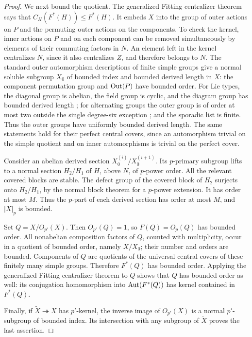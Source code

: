 \begin{proof}
We next bound the quotient.  The generalized Fitting centralizer
theorem \cite[(31.13)]{Aschbacher} says that
$C_H(F^*(H))\leq F^*(H)$.  It embeds $X$ into the
group of outer actions on $P$ and the permuting outer actions on the
components.  To check the kernel, inner actions on $P$ and on each
component can be removed simultaneously by elements of their
commuting factors in $N$.  An element left in the kernel centralizes
$N$, since it also centralizes $Z$, and therefore belongs to $N$.
The standard outer automorphism descriptions of finite simple groups
give a normal soluble subgroup $X_0$ of bounded index and bounded
derived length in $X$: the component permutation group and $\operatorname{Out}(P)$
have bounded order.  For Lie types, the diagonal group is abelian,
the field group is cyclic, and the diagram group has bounded
derived length \cite[Theorem~3.4]{BMO}; for alternating groups the
outer group is of order at most two outside the single degree-six
exception \cite[Theorem~2.3 and Section~2.4.2]{Wilson}; and the sporadic list is
finite.  Thus the outer groups have uniformly bounded derived
length.  The same statements hold for their perfect
central covers, since an automorphism trivial on the simple quotient
and on inner automorphisms is trivial on the perfect cover.

Consider an abelian derived section $X_0^{(i)}/X_0^{(i+1)}$.  Its
$p$-primary subgroup lifts to a normal section $H_2/H_1$ of $H$,
above $N$, of $p$-power order.  All the relevant covered blocks are
stable.  The defect group of the covered block of $H_2$ surjects onto
$H_2/H_1$, by the normal block theorem for a $p$-power extension.
It has order at most $M$.  Thus the $p$-part of each derived section
has order at most $M$, and $|X|_p$ is bounded.

Set $Q=X/O_{p'}(X)$.  Then $O_{p'}(Q)=1$, so $F(Q)=O_p(Q)$ has
bounded order.  All nonabelian composition factors of $Q$, counted
with multiplicity, occur in a quotient of bounded order, namely
$X/X_0$; their number and orders are bounded.  Components of $Q$
are quotients of the universal central covers of these finitely many
simple groups.  Therefore $F^*(Q)$ has bounded order.  Applying the
generalized Fitting centralizer theorem to $Q$ shows that $Q$ has
bounded order as well: its conjugation homomorphism into
$\operatorname{Aut}(F^*(Q))$ has kernel contained in $F^*(Q)$.

Finally, if $\widetilde X\twoheadrightarrow X$ has $p'$-kernel, the
inverse image of $O_{p'}(X)$ is a normal $p'$-subgroup of bounded
index.  Its intersection with any subgroup of $\widetilde X$ proves
the last assertion.
\end{proof}


